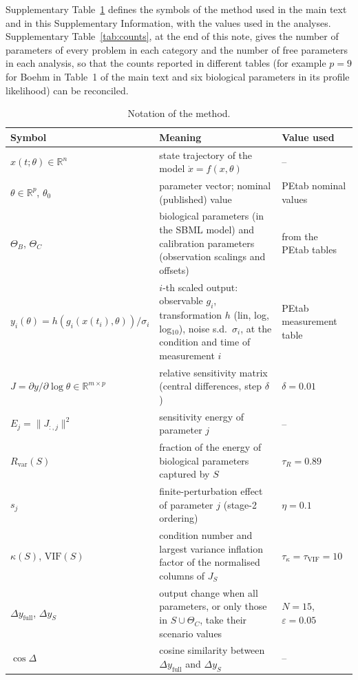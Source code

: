 \documentclass[11pt]{article}
\theoremstyle{definition}
\theoremstyle{plain}
\theoremstyle{remark}
\begin{document}
Supplementary Table~\ref{tab:notation} defines the symbols of the method used in the main text and in this Supplementary Information, with the values used in the analyses. Supplementary Table~\ref{tab:counts}, at the end of this note, gives the number of parameters of every problem in each category and the number of free parameters in each analysis, so that the counts reported in different tables (for example $p=9$ for Boehm in Table~1 of the main text and six biological parameters in its profile likelihood) can be reconciled.

\begin{longtable}{@{}p{5.2cm}p{7.6cm}p{3.2cm}@{}}
\caption{Notation of the method.}\label{tab:notation}\\
\toprule
Symbol & Meaning & Value used \\
\midrule
\endhead
$x(t;\theta)\in\mathbb{R}^n$ & state trajectory of the model $\dot x=f(x,\theta)$ & -- \\
$\theta\in\mathbb{R}^p$, $\theta_0$ & parameter vector; nominal (published) value & PEtab nominal values \\
$\Theta_B$, $\Theta_C$ & biological parameters (in the SBML model) and calibration parameters (observation scalings and offsets) & from the PEtab tables \\
$y_i(\theta)=h(g_i(x(t_i),\theta))/\sigma_i$ & $i$-th scaled output: observable $g_i$, transformation $h$ (lin, log, log$_{10}$), noise s.d.\ $\sigma_i$, at the condition and time of measurement $i$ & PEtab measurement table \\
$J=\partial y/\partial\log\theta\in\mathbb{R}^{m\times p}$ & relative sensitivity matrix (central differences, step $\delta$) & $\delta=0.01$ \\
$E_j=\|J_{:,j}\|^2$ & sensitivity energy of parameter $j$ & -- \\
$R_{\mathrm{var}}(S)$ & fraction of the energy of biological parameters captured by $S$ & $\tau_R=0.89$ \\
$s_j$ & finite-perturbation effect of parameter $j$ (stage-2 ordering) & $\eta=0.1$ \\
$\kappa(S)$, $\mathrm{VIF}(S)$ & condition number and largest variance inflation factor of the normalised columns of $J_S$ & $\tau_\kappa=\tau_{\mathrm{VIF}}=10$ \\
$\Delta y_{\mathrm{full}}$, $\Delta y_S$ & output change when all parameters, or only those in $S\cup\Theta_C$, take their scenario values & $N=15$, $\varepsilon=0.05$ \\
$\cos\Delta$ & cosine similarity between $\Delta y_{\mathrm{full}}$ and $\Delta y_S$ & -- \\

\end{longtable}
\end{document}
